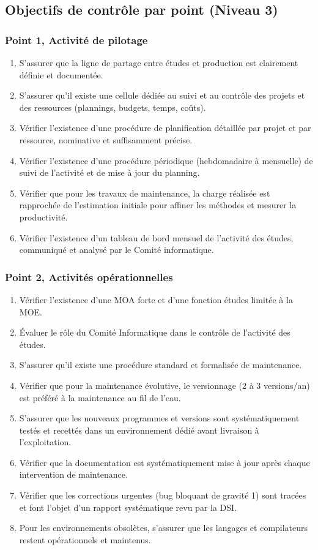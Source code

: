 \subsection{Objectifs de contrôle par point (Niveau 3)}

\subsubsection{Point 1, Activité de pilotage}
\begin{enumerate}[label=1.\arabic*.]
    \item S'assurer que la ligne de partage entre études et production est clairement définie et documentée.
    \item S'assurer qu'il existe une cellule dédiée au suivi et au contrôle des projets et des ressources (plannings, budgets, temps, coûts).
    \item Vérifier l'existence d'une procédure de planification détaillée par projet et par ressource, nominative et suffisamment précise.
    \item Vérifier l'existence d'une procédure périodique (hebdomadaire à mensuelle) de suivi de l'activité et de mise à jour du planning.
    \item Vérifier que pour les travaux de maintenance, la charge réalisée est rapprochée de l'estimation initiale pour affiner les méthodes et mesurer la productivité.
    \item Vérifier l'existence d'un tableau de bord mensuel de l'activité des études, communiqué et analysé par le Comité informatique.
\end{enumerate}

\subsubsection{Point 2, Activités opérationnelles}
\begin{enumerate}[label=2.\arabic*.]
    \item Vérifier l'existence d'une MOA forte et d'une fonction études limitée à la MOE.
    \item Évaluer le rôle du Comité Informatique dans le contrôle de l'activité des études.
    \item S'assurer qu'il existe une procédure standard et formalisée de maintenance.
    \item Vérifier que pour la maintenance évolutive, le versionnage (2 à 3 versions/an) est préféré à la maintenance au fil de l'eau.
    \item S'assurer que les nouveaux programmes et versions sont systématiquement testés et recettés dans un environnement dédié avant livraison à l'exploitation.
    \item Vérifier que la documentation est systématiquement mise à jour après chaque intervention de maintenance.
    \item Vérifier que les corrections urgentes (bug bloquant de gravité 1) sont tracées et font l'objet d'un rapport systématique revu par la DSI.
    \item Pour les environnements obsolètes, s'assurer que les langages et compilateurs restent opérationnels et maintenus.
\end{enumerate}

